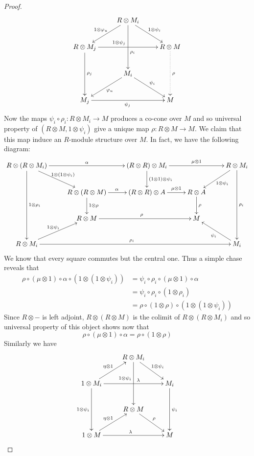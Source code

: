 \begin{refsection}
\begin{proof}
\begin{equation*}
\xymatrix{ & R \otimes M_i \ar[dl]_{1 \otimes \varphi_u} \ar[dr]^{1 \otimes \psi_i} \ar[dd]^(.6){\rho_i} \\
R \otimes M_j \ar[rr]^(.4){1 \otimes \psi_j} \ar[dd]^{\rho_j} & & R \otimes M \ar@{.>}[dd]^{\rho} \\ & M_i \ar[dl]^{\varphi_u} \ar[dr]^{\psi_i} \\ M_j \ar[rr]_{\psi_j} & & M }
\end{equation*}
Now the maps $\psi_i \circ \rho_i \colon R \otimes M_i \to M$ produces a co-cone over $M$ and so universal property of $(R \otimes M, 1 \otimes \psi_i)$ give a unique map $\rho \colon R \otimes M \to M$. We claim that this map induce an $R$-module structure over $M$. In fact, we have the following diagram:
\begin{equation*}
\xymatrix{ R \otimes (R \otimes M_i) \ar[rr]^\alpha \ar[ddd]^{1 \otimes \rho_i} \ar[dr]^{1 \otimes (1 \otimes \psi_i)} & & (R \otimes R) \otimes M_i \ar[d]^{(1 \otimes 1) \otimes \psi_i} \ar[rr]^-{\mu \otimes 1} & & R \otimes M_i \ar[dl]^{1 \otimes \psi_i} \ar[ddd]^{\rho_i} \\ & R \otimes (R \otimes M) \ar[r]^\alpha \ar[d]^{1 \otimes \rho} & (R \otimes R) \otimes A \ar[r]^-{\mu \otimes 1} & R \otimes A \ar[d]^\rho \\ & R \otimes M \ar[rr]^\rho & & M \\ R \otimes M_i \ar[ur]^{1 \otimes \psi_i} \ar[rrrr]^{\rho_i} & & & & M_i \ar[ul]^{\psi_i} }
\end{equation*}
We know that every square commutes but the central one. Thus a simple chase reveals that
\begin{align*}
\rho \circ (\mu \otimes 1) \circ \alpha \circ (1 \otimes ( 1 \otimes \psi_i)) & = \psi_i \circ \rho_i \circ (\mu \otimes 1) \circ \alpha \\ & = \psi_i \circ \rho_i \circ (1 \otimes \rho_i) \\ & = \rho \circ (1 \otimes \rho) \circ (1 \otimes (1 \otimes \psi_i))
\end{align*}
Since $R \otimes -$ is left adjoint, $R \otimes (R \otimes M)$ is the colimit of $R \otimes (R \otimes M_i)$ and so universal property of this object shows now that
\begin{equation*}
\rho \circ (\mu \otimes 1) \circ \alpha = \rho \circ (1 \otimes \rho)
\end{equation*}
Similarly we have
\begin{equation*}
\xymatrix { & R \otimes M_i \ar[dr]^{1 \otimes \psi_i} \ar[dd]_(.4){1 \otimes \psi_i} \\ 1 \otimes M_i \ar[ur]^{\eta \otimes 1} \ar[dd]_{1 \otimes \psi_i} \ar[rr]^(.6){\lambda} & & M_i \ar[dd]^{\psi_i} \\ & R \otimes M \ar[dr]^{\rho} \\ 1 \otimes M \ar[ur]^{\eta \otimes 1} \ar[rr]^{\lambda} & & M }

\end{equation*}
\end{proof}
\end{refsection}

